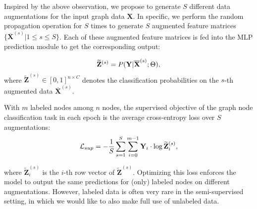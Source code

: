 { 
 Inspired by the above observation, we propose to generate $S$ different data augmentations for the input graph data $\mathbf{X}$. 
In specific, we perform the random propagation operation for $S$ times to generate $S$ augmented feature matrices $\{\overline{\mathbf{X}}^{(s)}|1\leq s \leq S\}$. 
Each of these augmented feature matrices is fed into the MLP prediction module to get the corresponding output:

\begin{equation}
 \small
     \widetilde{\mathbf{Z}}^{(s)} = P(\mathbf{Y}|\overline{\mathbf{X}}^{(s)}; \Theta), 
 \end{equation}
where $\widetilde{\mathbf{Z}}^{(s)} \in [0,1]^{n\times C}$ denotes the classification probabilities on the $s$-th augmented data $\overline{\mathbf{X}}^{(s)}$. 


With $m$ labeled nodes among $n$ nodes, the supervised objective of the graph node classification task in each epoch is the average cross-entropy loss over $S$ augmentations:
\begin{equation}
\small
\label{equ:loss}
	\mathcal{L}_{sup} = -\frac{1}{S}\sum_{s=1}^{S}\sum_{i=0}^{m-1}\mathbf{Y}_{i} \cdot \log \widetilde{\mathbf{Z}}_{i}^{(s)} ,
\end{equation}

\noindent where $\widetilde{\mathbf{Z}}_i^{(s)}$ is the $i$-th row vector of  $\widetilde{\mathbf{Z}}^{(s)}$. Optimizing this loss enforces the model to output the same predictions for (only) labeled nodes on different augmentations.
However, labeled data is often very rare in the semi-supervised setting, in which we would like to also make full use of unlabeled data. 





}
